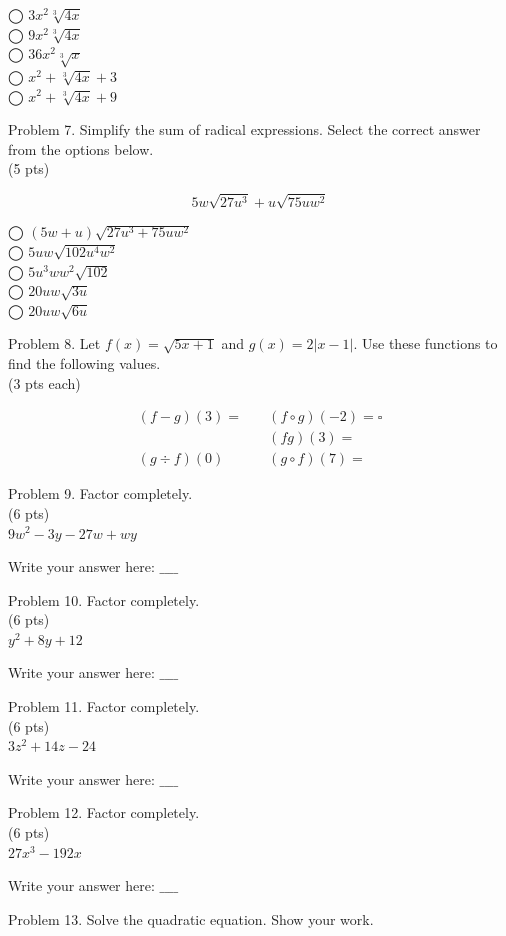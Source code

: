 \documentclass{ximera}
\begin{document}
◯ $3 x^{2} \sqrt[3]{4 x}$\\
◯ $9 x^{2} \sqrt[3]{4 x}$\\
◯ $36 x^{2} \sqrt[3]{x}$\\
◯ $x^{2}+\sqrt[3]{4 x}+3$\\
◯ $x^{2}+\sqrt[3]{4 x}+9$

Problem 7. Simplify the sum of radical expressions. Select the correct answer from the options below.\\
(5 pts)

$$5 w \sqrt{27 u^{3}}+u \sqrt{75 u w^{2}}$$

◯ $(5 w+u) \sqrt{27 u^{3}+75 u w^{2}}$\\
◯ $5 u w \sqrt{102 u^{4} w^{2}}$\\
◯ $5 u^{3} w w^{2} \sqrt{102}$\\
◯ $20 u w \sqrt{3 u}$\\
◯ $20 u w \sqrt{6 u}$

Problem 8. Let $f(x)=\sqrt{5 x+1}$ and $g(x)=2|x-1|$. Use these functions to find the following values.\\
(3 pts each)

$$\begin{array}{ll}
(f-g)(3)=\quad & (f \circ g)(-2)=\square \\
& (f g)(3)= \\
(g \div f)(0) & (g \circ f)(7)=
\end{array}$$

Problem 9. Factor completely.\\
(6 pts)\\
$9 w^{2}-3 y-27 w+w y$

Write your answer here: $\_\_\_\_$

Problem 10. Factor completely.\\
(6 pts)\\
$y^{2}+8 y+12$

Write your answer here: $\_\_\_\_$

Problem 11. Factor completely.\\
(6 pts)\\
$3 z^{2}+14 z-24$

Write your answer here: $\_\_\_\_$

Problem 12. Factor completely.\\
(6 pts)\\
$27 x^{3}-192 x$

Write your answer here: $\_\_\_\_$

Problem 13. Solve the quadratic equation. Show your work.
\end{document}
